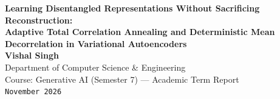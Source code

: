 \documentclass[11pt,a4paper]{article}
\begin{document}
\begin{center}
    {\LARGE \textbf{Learning Disentangled Representations Without Sacrificing Reconstruction:\\[0.25em]
    Adaptive Total Correlation Annealing and Deterministic Mean Decorrelation in Variational Autoencoders}}\\[1.2em]
    
    {\large \textbf{Vishal Singh}}\\[0.3em]
    {\normalsize Department of Computer Science \& Engineering}\\[0.15em]
    {\normalsize Course: Generative AI (Semester 7) --- Academic Term Report}\\[0.15em]
    {\small \texttt{November 2026}}
\end{center}

\vspace{0.5em}
\end{document}
